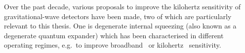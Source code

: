 Over the past decade, various proposals to improve the kilohertz sensitivity of gravitational-wave detectors have been made, two of which are particularly relevant to this thesis.
One is degenerate internal squeezing (also known as a degenerate quantum expander) %
which has been characterised in different operating regimes, e.g.\ to improve broadband~\cite{korobkoQuantumExpanderGravitationalwave2019} or kilohertz~\cite{adyaQuantumEnhancedKHz2020} sensitivity. 
